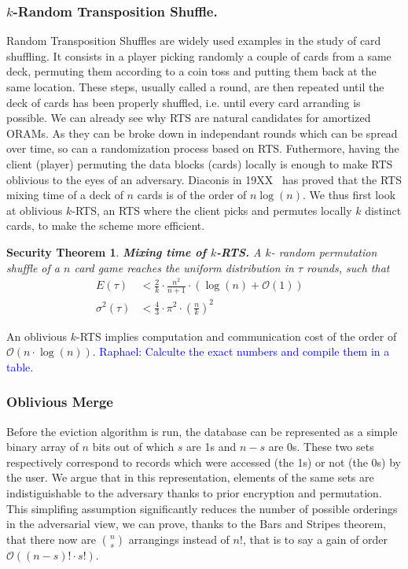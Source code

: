 \documentclass[conference]{IEEEtran}
\newtheorem{secthm}{Security Theorem}
\newcommand{\raphael}[1]{\textcolor{blue}{Raphael: #1}}
\begin{document}
\subsubsection{$k$-Random Transposition Shuffle.}
Random Transposition Shuffles are widely used examples in the study of card shuffling. It consists in a player picking randomly a couple of cards from a same deck, permuting them according to a coin toss and putting them back at the same location.
These steps, usually called a round, are then repeated until the deck of cards has been properly shuffled, i.e. until every card arranding is possible.
We can already see why RTS are natural candidates for amortized ORAMs. As they can be broke down in independant rounds which can be spread over time, so can a randomization process based on RTS. Futhermore, having the client (player) permuting the data blocks (cards) locally is enough to make RTS oblivious to the eyes of an adversary.
Diaconis in 19XX~\cite{} has proved that the RTS mixing time of a deck of $n$ cards is of the order of $n\log(n)$. We thus first look at oblivious $k$-RTS, an RTS where the client picks and permutes locally $k$ distinct cards, to make the scheme more efficient.

\begin{secthm}
\textbf{Mixing time of $k$-RTS.} A $k$- random permutation shuffle of a $n$ card game reaches the uniform distribution in $\tau$ rounds, such that
\begin{align*}
E(\tau) &< \frac{2}{k}\cdot\frac{n^2}{n+1}\cdot \left ( \log(n) + \mathcal{O}(1) \right ) &\\
\sigma^2(\tau) &< \frac{4}{3} \cdot {\pi}^2 \cdot \left ( \frac{n}{k} \right )^2 &
\end{align*}
\end{secthm}

An oblivious $k$-RTS implies computation and communication cost of the order of $\mathcal{O} \left(n\cdot \log(n)\right)$.
\raphael{Calculte the exact numbers and compile them in a table.}

\subsubsection{Oblivious Merge}
Before the eviction algorithm is run, the database can be represented as a simple binary array of $n$ bits out of which $s$ are 1s and $n-s$ are 0s. These two sets respectively correspond to records which were accessed (the 1s) or not (the 0s) by the user.
We argue that in this representation, elements of the same sets are indistiguishable to the adversary thanks to prior encryption and permutation.
This simplifing assumption significantly reduces the number of possible orderings in the adversarial view, we can prove, thanks to the Bars and Stripes theorem, that there now are ${n \choose s}$ arrangings instead of $n!$, that is to say a gain of order $\mathcal{O}\left ( (n-s)!\cdot s!\right )$.
\end{document}
